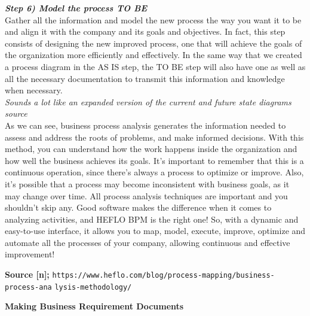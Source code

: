 \documentclass{article}
\begin{document}
{\vspace{0.3cm} 

\textbf{\textit{Step 6) Model the process TO BE}} \\ 

Gather all the information and model the new process the way you want it to be and align it with the company and its goals and objectives. In fact, this step consists of designing the new improved process, one that will achieve the goals of the organization more efficiently and effectively. In the same way that we created a process diagram in the AS IS step, the TO BE step will also have one as well as all the necessary documentation to transmit this information and knowledge when necessary. \\

\textit{Sounds a lot like an expanded version of the current and future state diagrams source} \\

As we can see, business process analysis generates the information needed to assess and address the roots of problems, and make informed decisions. With this method, you can understand how the work happens inside the organization and how well the business achieves its goals. It’s important to remember that this is a continuous operation, since there’s always a process to optimize or improve. Also, it’s possible that a process may become inconsistent with business goals, as it may change over time. All process analysis techniques are important and you shouldn’t skip any. Good software makes the difference when it comes to analyzing activities, and HEFLO BPM is the right one! So, with a dynamic and easy-to-use interface, it allows you to map, model, execute, improve, optimize and automate all the processes of your company, allowing continuous and effective improvement! \\

\vspace{0.3cm} 

\hspace{-0.65cm} \textbf{Source [n];} \hspace{0.35cm} \texttt{https://www.heflo.com/blog/process-mapping/business-process-ana}
\hspace{0.95cm} \texttt{lysis-methodology/}

}

\newpage

\hspace{-0.65cm} \large{\textbf{Making Business Requirement Documents}} \\
\end{document}
